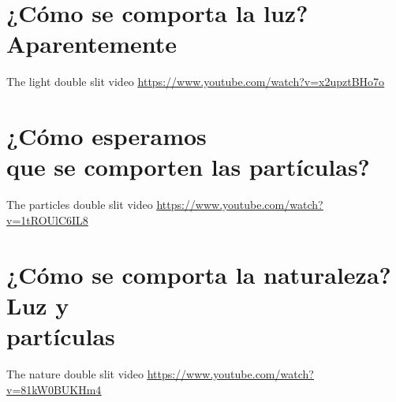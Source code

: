 \documentclass[14pt,aspectratio=169,t]{beamer}
\begin{document}
\section{\LARGE\textbf{¿Cómo se comporta la luz?\\Aparentemente}}

\begin{frame}{The light double slit video}
  \href{https://www.youtube.com/watch?v=x2upztBHo7o}
      {\color{blue}\underline{https://www.youtube.com/watch?v=x2upztBHo7o}}
\end{frame}

\section{\LARGE\textbf{¿Cómo esperamos\\que se comporten las partículas?}}

\begin{frame}{The particles double slit video}
  \href{https://www.youtube.com/watch?v=1tROUlC6IL8}
      {\color{blue}\underline{https://www.youtube.com/watch?v=1tROUlC6IL8}}
\end{frame}

\section{\LARGE\textbf{¿Cómo se comporta la naturaleza?\\Luz y\\partículas}}

\begin{frame}{The nature double slit video}
  \href{https://www.youtube.com/watch?v=81kW0BUKHm4}
      {\color{blue}\underline{https://www.youtube.com/watch?v=81kW0BUKHm4}}
\end{frame}
\end{document}
